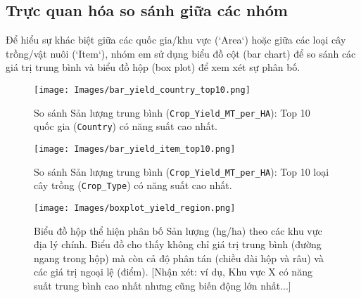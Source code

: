 \subsection{Trực quan hóa so sánh giữa các nhóm}
\label{subsec:viz_group_comparison}

Để hiểu sự khác biệt giữa các quốc gia/khu vực (`Area`) hoặc giữa các loại cây trồng/vật nuôi (`Item`), nhóm em sử dụng biểu đồ cột (bar chart) để so sánh các giá trị trung bình và biểu đồ hộp (box plot) để xem xét sự phân bố.

\begin{figure}[htb] 
    \centering
    \texttt{[image: Images/bar\_yield\_country\_top10.png]} 
    \vspace{8pt} 
    \caption{So sánh Sản lượng trung bình (\texttt{Crop\_Yield\_MT\_per\_HA}): Top 10 quốc gia (\texttt{Country}) có năng suất cao nhất.}
    \label{fig:bar_yield_country} 
\end{figure}

\begin{figure}[htb] 
    \centering
    \texttt{[image: Images/bar\_yield\_item\_top10.png]}
    \vspace{8pt}
    \caption{So sánh Sản lượng trung bình (\texttt{Crop\_Yield\_MT\_per\_HA}): Top 10 loại cây trồng (\texttt{Crop\_Type}) có năng suất cao nhất.}
    \label{fig:bar_yield_item} 
     \vspace{10pt}
\end{figure}


 \FloatBarrier
\begin{figure}[H]
    \centering
    \texttt{[image: Images/boxplot\_yield\_region.png]} 
    \vspace{10pt}
    \caption{ Biểu đồ hộp thể hiện phân bố Sản lượng (hg/ha) theo các khu vực địa lý chính. Biểu đồ cho thấy không chỉ giá trị trung bình (đường ngang trong hộp) mà còn cả độ phân tán (chiều dài hộp và râu) và các giá trị ngoại lệ (điểm). [Nhận xét: ví dụ, Khu vực X có năng suất trung bình cao nhất nhưng cũng biến động lớn nhất...]}
    \label{fig:box_comparisons}
\end{figure}
